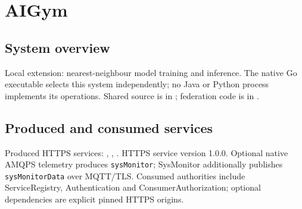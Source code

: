 \documentclass[a4paper]{arrowhead}
\begin{document}
\ArrowheadSetup
\begin{center}\vspace*{8mm}{\LARGE Arrowhead support systems in Go}\par\vspace{4mm}{\large Native implementation and interface catalogue}\end{center}
\begin{abstract}This catalogue covers the fifteen active support systems in the local Java reference, including AIGym as a local extension. It records the delivered Go design, service interfaces, security boundaries and explicit remaining work. It is a development document; it does not assert full Java interchangeability or that any running cloud has changed.\end{abstract}
\newpage\tableofcontents\newpage
\section{AIGym}
\subsection{System overview}
Local extension: nearest-neighbour model training and inference. The native Go executable selects this system independently; no Java or Python process implements its operations. Shared source is in ; federation code is in .
\subsection{Produced and consumed services}
Produced HTTPS services: , \allowbreak {}, \allowbreak {}.
HTTPS service version 1.0.0. Optional native AMQPS telemetry produces \texttt{sysMonitor}; SysMonitor additionally publishes \texttt{sysMonitorData} over MQTT/TLS. Consumed authorities include ServiceRegistry, Authentication and ConsumerAuthorization; optional dependencies are explicit pinned HTTPS origins.
\end{document}
